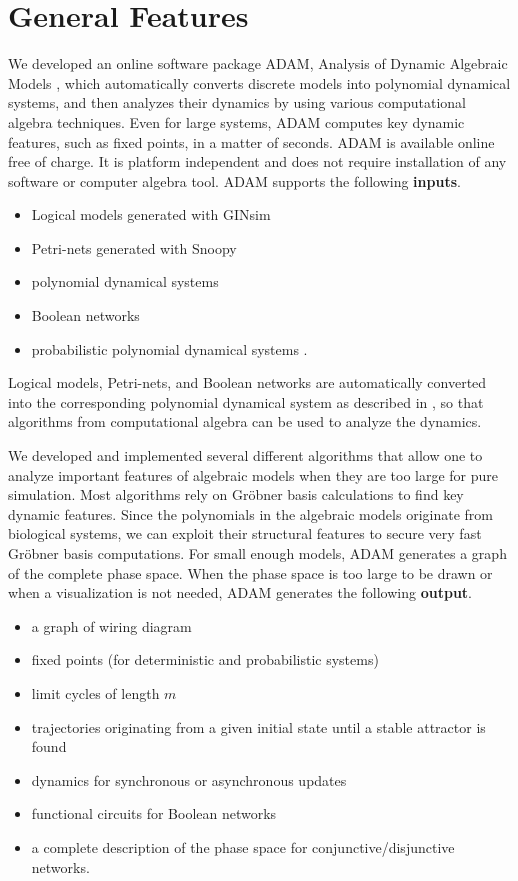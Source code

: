 \documentclass[11pt]{amsart}
\begin{document}
\section{General Features}
We developed an
online software package ADAM, Analysis of Dynamic Algebraic Models \cite{ADAM}, which automatically converts discrete models into polynomial dynamical
systems, and then analyzes their dynamics by using various computational algebra techniques. Even for large systems, ADAM
computes key dynamic features, such as fixed points, in a matter of seconds.
ADAM is available online free of charge. It is platform
independent and does not require installation of any software or computer
algebra tool. 
ADAM supports the following {\bf inputs}.
\begin{itemize}
  \item Logical models generated with GINsim \cite{GINsim}
  \item Petri-nets generated with Snoopy \cite{Snoopy}
  \item polynomial dynamical systems
  \item Boolean networks
  \item probabilistic polynomial dynamical systems \cite{shmulevich}.
\end{itemize}
Logical models, Petri-nets, and Boolean networks are automatically converted
into the corresponding polynomial dynamical system as described in
\cite{Alan:Bioinf2010}, so that algorithms from computational
algebra can be used to analyze the dynamics. 

We developed and implemented several different algorithms that allow one to analyze 
important features of algebraic models when they are too large for pure simulation. 
Most algorithms rely on Gr\"obner basis calculations to find key dynamic
features. 
Since the polynomials in the algebraic
models originate from biological systems, we can exploit their structural
features to secure very fast Gr\"obner basis computations. 
For small enough models, ADAM generates a graph of the complete phase space.
When the phase space is too large to be drawn or when a visualization is not
needed, ADAM generates the following {\bf output}.
\begin{itemize}
  \item a graph of wiring diagram
  \item fixed points (for deterministic and probabilistic systems)
  \item limit cycles of length $m$
  \item trajectories originating from a given initial state until a stable
  attractor is found
  \item dynamics for synchronous or asynchronous updates
  \item functional circuits for Boolean networks
  \item a complete description of the phase space for conjunctive/disjunctive
  networks.
\end{itemize}
\end{document}

